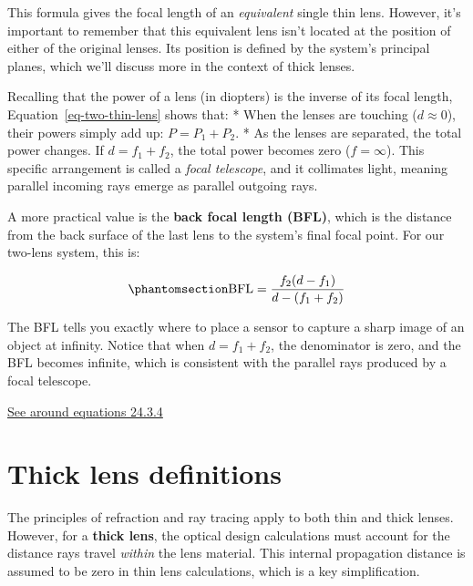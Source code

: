 \documentclass[
  letterpaper,
]{book}
\begin{document}
This formula gives the focal length of an \emph{equivalent} single thin
lens. However, it's important to remember that this equivalent lens
isn't located at the position of either of the original lenses. Its
position is defined by the system's principal planes, which we'll
discuss more in the context of thick lenses.

Recalling that the power of a lens (in diopters) is the inverse of its
focal length, Equation~\ref{eq-two-thin-lens} shows that: * When the
lenses are touching (\(d \approx 0\)), their powers simply add up:
\(P = P_1 + P_2\). * As the lenses are separated, the total power
changes. If \(d = f_1 + f_2\), the total power becomes zero
(\(f = \infty\)). This specific arrangement is called a \emph{focal
telescope}, and it collimates light, meaning parallel incoming rays
emerge as parallel outgoing rays.

A more practical value is the \textbf{back focal length (BFL)}, which is
the distance from the back surface of the last lens to the system's
final focal point. For our two-lens system, this is:

\begin{equation}\phantomsection\label{eq-back-focal-length}{
\text{BFL} = \frac{f_2 (d - f_1 )}{d - (f_1 + f_2)}
}\end{equation}

The BFL tells you exactly where to place a sensor to capture a sharp
image of an object at infinity. Notice that when \(d = f_1 + f_2\), the
denominator is zero, and the BFL becomes infinite, which is consistent
with the parallel rays produced by a focal telescope.

\href{https://phys.libretexts.org/Bookshelves/University_Physics/Physics_(Boundless)/24\%3A_Geometric_Optics/24.3\%3A_Lenses\#:~:text=The\%20focal\%20length\%20of\%20a,surfaces\%20are\%20convex\%20or\%20concave.}{See
around equations 24.3.4}

\section{Thick lens definitions}\label{thick-lens-definitions}

The principles of refraction and ray tracing apply to both thin and
thick lenses. However, for a \textbf{thick lens}, the optical design
calculations must account for the distance rays travel \emph{within} the
lens material. This internal propagation distance is assumed to be zero
in thin lens calculations, which is a key simplification.
\end{document}
